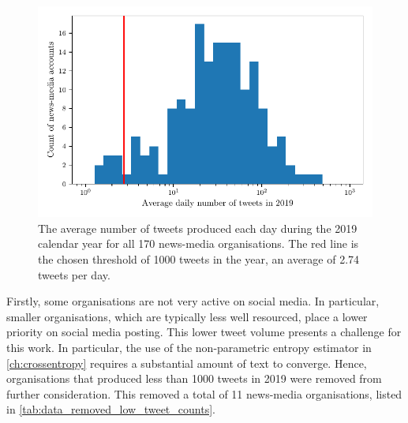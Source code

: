 \begin{figure}[!htbp]
	\centering
	\includegraphics{chapter1/figs/averagetweetactivity}
	\caption{The average number of tweets produced each day during the 2019 calendar year for all 170 news-media organisations. The red line is the chosen threshold of 1000 tweets in the year, an average of 2.74 tweets per day.}
	\label{fig:data_cleaning_average_tweet_activity}
\end{figure}

Firstly, some organisations are not very active on social media. In particular, smaller organisations, which are typically less well resourced, place a lower priority on social media posting. This lower tweet volume presents a challenge for this work. In particular, the use of the non-parametric entropy estimator in \autoref{ch:crossentropy} requires a substantial amount of text to converge. Hence, organisations that produced less than 1000 tweets in 2019 were removed from further consideration. This removed a total of 11 news-media organisations, listed in  \autoref{tab:data_removed_low_tweet_counts}.


